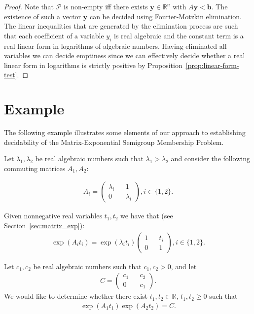 \documentclass[format=acmsmall, review=false, screen=true]{acmart}
\newcommand{\Reals}{\mathbb{R}}
\newcommand{\myvector}{\boldsymbol}
\begin{document}
\begin{proof}
Note that $\mathcal{P}$ is non-empty iff there exists
$\boldsymbol{y} \in \Reals^n$ with $A\myvector {y} < \myvector{b}$.
The existence of such a vector $\boldsymbol{y}$ can be decided using
Fourier-Motzkin elimination.  The linear inequalities that are
generated by the elimination process are such that each coefficient of
a variable $y_i$ is real algebraic and the constant term is a real
linear form in logarithms of algebraic numbers.  Having eliminated all
variables we can decide emptiness since we can effectively decide
whether a real linear form in logarithms is strictly positive by
Proposition~\ref{prop:linear-form-test}.
\end{proof}

\section{Example}
The following example illustrates some elements of our approach to
establishing decidability of the Matrix-Exponential Semigroup
Membership Problem.

Let $\lambda_{1}, \lambda_{2}$ be real algebraic
numbers such that $\lambda_{1} > \lambda_{2}$ and consider the
following commuting matrices $A_{1}, A_{2}$:

\begin{align*}
A_{i} = \begin{pmatrix} \lambda_{i} && 1 \\ 0 && \lambda_{i} \end{pmatrix}, i \in \lbrace 1, 2 \rbrace .
\end{align*}

Given nonnegative real variables $t_{1},t_{2}$ we have that (see Section~\ref{sec:matrix_exp}):
\begin{gather}
\exp(A_{i} t_{i}) = \exp (\lambda_{i} t_{i})
\begin{pmatrix} 1 && t_{i} \\ 0 && 1 \end{pmatrix}, i \in \lbrace 1, 2 \rbrace .
\label{eq:simple-form}
\end{gather}

Let $c_{1}, c_{2}$ be real algebraic numbers such that $c_{1}, c_{2} > 0$, and let
\begin{align*}
C = \begin{pmatrix} c_{1} && c_{2} \\ 0 && c_{1} \end{pmatrix} .
\end{align*}
We would like to determine whether there exist $t_{1}, t_{2} \in \Reals$, $t_{1}, t_{2} \geq 0$ such that
\begin{align}
\exp(A_{1} t_{1}) \exp(A_{2} t_{2}) = C.
\label{eq:goal}
\end{align}
\end{document}
